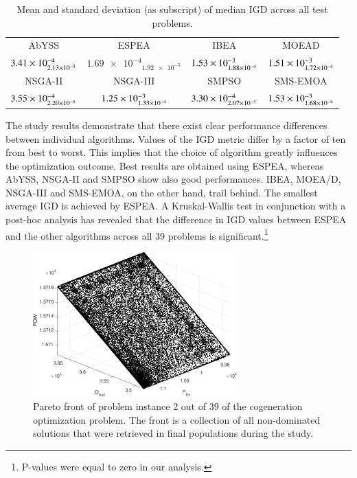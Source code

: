 \begin{table}
\caption{Mean and standard deviation (as subscript) of median IGD across all test problems.}
\label{tbl:summary}
\centering
\begin{tabular}{*{4}{c}} \toprule
AbYSS & ESPEA & IBEA & MOEAD\\ \cmidrule(lr){1-1} \cmidrule(lr){2-2} \cmidrule(lr){3-3} \cmidrule(lr){4-4}
$\num{3.41E-4}_{\num{2.13E-5}}$ & $\num{1.69e-4}_{\num{1.92e-5}}$ & $\num{1.53E-3}_{\num{1.88E-4}}$ & $\num{1.51E-3}_{\num{1.72E-4}}$ \\ \midrule
NSGA-II & NSGA-III & SMPSO & SMS-EMOA \\ \cmidrule(lr){1-1} \cmidrule(lr){2-2} \cmidrule(lr){3-3} \cmidrule(lr){4-4}
$\num{3.55E-4}_{\num{2.20E-5}}$ & $\num{1.25E-3}_{\num{1.33E-4}}$ & $\num{3.30E-4}_{\num{2.07E-5}}$ & $\num{1.53E-3}_{\num{1.68E-4}}$ \\
\bottomrule
\end{tabular}
\end{table}

The study results demonstrate that there exist clear performance differences between individual algorithms. Values of the IGD metric differ by a factor of ten from best to worst. This implies that the choice of algorithm greatly influences the optimization outcome. Best results are obtained using ESPEA, whereas AbYSS, NSGA-II and SMPSO show also good performances. IBEA, MOEA/D, NSGA-III and SMS-EMOA, on the other hand, trail behind. The smallest average IGD is achieved by ESPEA. A Kruskal-Wallis test \cite{kruskal1952use} in conjunction with a post-hoc analysis has revealed that the difference in IGD values between ESPEA and the other algorithms across all 39 problems is significant.\footnote{P-values were equal to zero in our analysis.}

\begin{figure}
\centering
\includegraphics[width=0.7\textwidth]{figures/paretofront_cropped.pdf}
\caption{Pareto front of problem instance 2 out of 39 of the cogeneration optimization problem. The front is a collection of all non-dominated solutions that were retrieved in final populations during the study.}
\label{fig:paretofront}
\end{figure}

